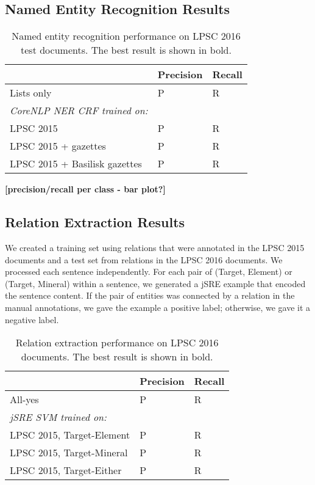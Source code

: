 \documentclass[letterpaper]{article} %
\begin{document}
\subsection{Named Entity Recognition Results}

\begin{table}
\caption{Named entity recognition performance on LPSC 2016 test documents.  
The best result is shown in bold.}
\label{tab:ner}
\begin{center}
\begin{tabular}{l|ll}
 & Precision & Recall \\ \hline
Lists only & P & R \\ \hline
{\em CoreNLP NER CRF trained on:} & & \\
LPSC 2015 & P & R \\
LPSC 2015 + gazettes & P & R \\
LPSC 2015 + Basilisk gazettes & P & R \\
\hline
\end{tabular}
\end{center}
\end{table}

{\bf [precision/recall per class - bar plot?]}

\subsection{Relation Extraction Results}

We created a training set using relations that were annotated in the
LPSC 2015 documents and a test set from relations in the LPSC 2016
documents.  We processed each sentence independently.  For each pair
of (Target, Element) or (Target, Mineral) within a sentence, we
generated a jSRE example that encoded the sentence content.  If the
pair of entities was connected by a relation in the manual
annotations, we gave the example a positive label; otherwise, we gave
it a negative label.

\begin{table}
\caption{Relation extraction performance on LPSC 2016 documents. 
The best result is shown in bold.}
\label{tab:re}
\begin{center}
\begin{tabular}{l|ll}
 & Precision & Recall \\ \hline
All-yes & P & R \\ \hline
{\em jSRE SVM trained on:} & & \\
LPSC 2015, Target-Element & P & R \\
LPSC 2015, Target-Mineral & P & R \\
LPSC 2015, Target-Either  & P & R \\
\hline
\end{tabular}
\end{center}
\end{table}
\end{document}
